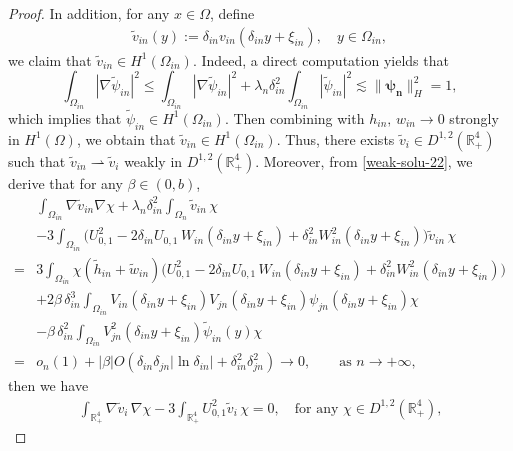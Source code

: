 \documentclass[10pt,a4paper]{amsart}
\newcommand{\R}{\mathbb{R}}
\begin{document}
\begin{proof}
In addition, for any $x\in\Omega$, define
\begin{align}
    \label{trans-2}\widetilde{v}_{in}(y):=\delta_{in}v_{in}\left(\delta_{in} y+\xi_{in}\right),\quad y\in\Omega_{in},
\end{align} 
 we claim that $\widetilde{v}_{in}\in H^1\left(\Omega_{in}\right)$. Indeed, a direct computation yields that $$\displaystyle\int_{\Omega_{in}}|\nabla\widetilde{\psi}_{in}|^2\leq \displaystyle\int_{\Omega_{in}}|\nabla\widetilde{\psi}_{in}|^2+\lambda_n\delta_{in}^2\displaystyle\int_{\Omega_{in}}|\widetilde{\psi}_{in}|^2\lesssim\|\bm{\psi_n}\|^2_{H}=1,$$
which implies that $\widetilde{\psi}_{in}\in H^1\left(\Omega_{in}\right)$. Then combining with $h_{in},\,w_{in}\to 0$ strongly in $H^1(\Omega)$, we obtain that $\widetilde{v}_{in}\in H^1\left(\Omega_{in}\right)$. Thus, there exists $\widetilde{v}_{i}\in D^{1,2}(\R^4_+)$ such that $\widetilde{v}_{in}\rightharpoonup \widetilde{v}_i$ weakly in $D^{1,2}(\R^4_+)$.
Moreover, from \eqref{weak-solu-22}, we derive that for any   $\beta\in(0,b)$,
\begin{align*}
    &\displaystyle\int_{\Omega_{in}}\nabla \widetilde{v}_{in}\nabla{\chi}+\lambda_n\delta_{in}^2\displaystyle\int_{\Omega_n}\widetilde{v}_{in}\,{\chi} \nonumber\\&-3\displaystyle\int_{\Omega_{in}}\Big(U_{0,1}^2-2\delta_{in}U_{0,1}\,W_{in}\left(\delta_{in} y+\xi_{in}\right)+\delta_{in}^2W_{in}^2\left(\delta_{in} y+\xi_{in}\right)\Big)\widetilde{v}_{in}\,{\chi}\nonumber\\=&3\displaystyle\int_{\Omega_{in}}{\chi}\left(\widetilde{h}_{in}+\widetilde{w}_{in}\right)\Big(U_{0,1}^2-2\delta_{in}U_{0,1}\,W_{in}\left(\delta_{in} y+\xi_{in}\right)+\delta_{in}^2W_{in}^2\left(\delta_{in} y+\xi_{in}\right)\Big)\nonumber\\&+2\beta\,{\delta}^3_{in}\displaystyle\int_{\Omega_{in}}V_{in}\left(\delta_{in} y+\xi_{in}\right)V_{jn}\left(\delta_{in} y+\xi_{in}\right)\psi_{jn}\left(\delta_{in} y+\xi_{in}\right){\chi}\nonumber\\&-\beta\,{\delta}^2_{in}\displaystyle\int_{\Omega_{in}}V^2_{jn}\left(\delta_{in} y+\xi_{in}\right)\widetilde{\psi}_{in}(y){\chi}\nonumber\\=&o_n(1)+|\beta|O\left(\delta_{in}\delta_{jn}|\ln{\delta_{in}}|+\delta_{in}^2\delta_{jn}^2\right)\longrightarrow 0,\qquad\text{as $n\to+\infty$,}
\end{align*}
then we have
\begin{align*}
    \displaystyle\int_{\R^4_+}\nabla \widetilde{v}_i\,\nabla{\chi}-3\displaystyle\int_{\R^4_+}U^2_{0,1}\widetilde{v}_i\,{\chi}=0,\quad\text{for any $\chi\in D^{1,2}(\R^4_+)$,}

\end{align*}
\end{proof}
\end{document}
